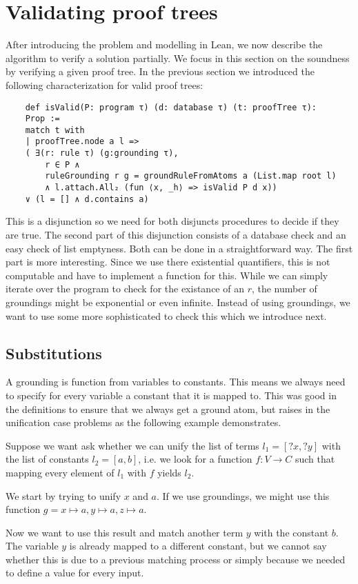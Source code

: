 \section{Validating proof trees}\label{sec:valTree}

After introducing the problem and modelling in Lean, we now describe the algorithm to verify a solution partially. We focus in this section on the soundness by verifying a given proof tree. In the previous section we introduced the following characterization for valid proof trees:

\begin{lstlisting}
    def isValid(P: program τ) (d: database τ) (t: proofTree τ): 
    Prop :=
    match t with
    | proofTree.node a l => 
    ( ∃(r: rule τ) (g:grounding τ), 
        r ∈ P ∧ 
        ruleGrounding r g = groundRuleFromAtoms a (List.map root l)
        ∧ l.attach.All₂ (fun ⟨x, _h⟩ => isValid P d x)) 
    ∨ (l = [] ∧ d.contains a)
\end{lstlisting}

This is a disjunction so we need for both disjuncts procedures to decide if they are true.
The second part of this disjunction consists of a database check and an easy check of list emptyness. Both can be done in a straightforward way.
The first part is more interesting. Since we use there existential quantifiers, this is not computable and have to implement a function for this. While we can simply iterate over the program to check for the existance of an $r$, the number of groundings might be exponential or even infinite. Instead of using groundings, we want to use some more sophisticated to check this which we introduce next.


\subsection{Substitutions}
    A grounding is function from variables to constants. This means we always need to specify for every variable a constant that it is mapped to. This was good in the definitions to ensure that we always get a ground atom, but raises in the unification case problems as the following example demonstrates.

    \begin{example}
        Suppose we want ask whether we can unify the list of terms $l_1 = [?x, ?y]$ with the list of constants $l_2= [a,b]$, i.e. we look for a function $f: V \to C$ such that mapping every element of $l_1$ with $f$ yields $l_2$.

        We start by trying to unify $x$ and $a$. If we use groundings, we might use this function $g = x \mapsto a, y \mapsto a, z \mapsto a$.

        Now we want to use this result and match another term $y$ with the constant $b$. The variable $y$ is already mapped to a different constant, but we cannot say whether this is due to a previous matching process or simply because we needed to define a value for every input.         
    \end{example}
    
